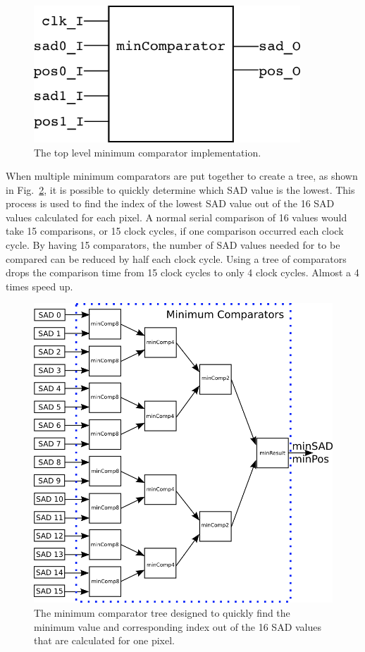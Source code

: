 \begin{figure}[h]
	\begin{center}
		\includegraphics[width=100mm]{figures/minComparator_rtl.png}
		\captionfonts
		\caption{The top level minimum comparator implementation.}
		\label{fig:minComp_rtl}
	\end{center}
\end{figure}

When multiple minimum comparators are put together to create a tree, as shown in Fig.~\ref{fig:minComp}, it is possible to quickly determine which SAD value is the lowest. This process is used to find the index of the lowest SAD value out of the 16 SAD values calculated for each pixel. A normal serial comparison of 16 values would take 15 comparisons, or 15 clock cycles, if one comparison occurred each clock cycle. By having 15 comparators, the number of SAD values needed for to be compared can be reduced by half each clock cycle. Using a tree of comparators drops the comparison time from 15 clock cycles to only 4 clock cycles. Almost a 4 times speed up.

\begin{figure}[h]
	\begin{center}
		\includegraphics[width=150mm]{figures/minComparator.png}
		\captionfonts
		\caption{The minimum comparator tree designed to quickly find the minimum value and corresponding index out of the 16 SAD values that are calculated for one pixel.}
		\label{fig:minComp}
	\end{center}
\end{figure}

